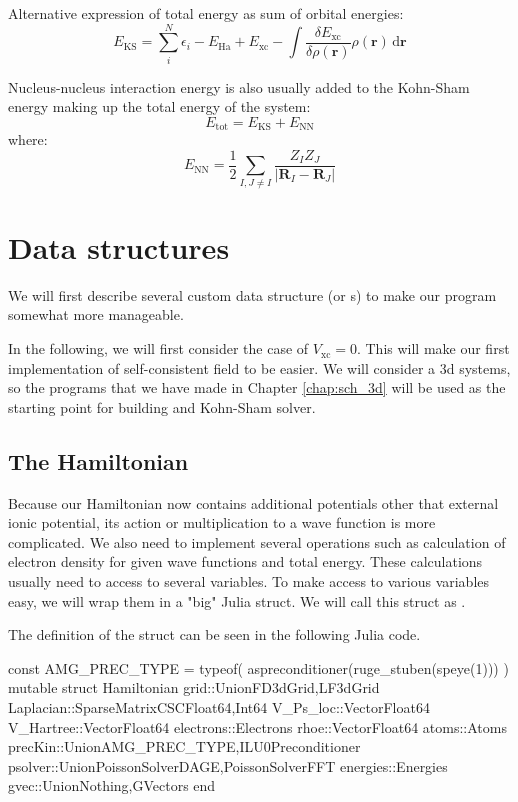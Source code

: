 Alternative expression of total energy as sum of orbital energies:
\begin{equation}
E_{\mathrm{KS}} = \sum_{i}^{N} \epsilon_{i} - E_{\mathrm{Ha}} + E_{\mathrm{xc}}
- \int \frac{\delta E_{\mathrm{xc}}}{\delta \rho(\mathbf{r})} \rho(\mathbf{r})
\,\mathrm{d}\mathbf{r}
\end{equation}

Nucleus-nucleus interaction energy is also usually added to the Kohn-Sham energy
making up the total energy of the system:
\begin{equation}
E_{\mathrm{tot}} = E_{\mathrm{KS}} + E_{\mathrm{NN}}
\end{equation}
where:
\begin{equation}
E_{\mathrm{NN}} = \frac{1}{2} \sum_{I,J \neq I}
\frac{Z_{I} Z_{J}}{\left| \mathbf{R}_{I} - \mathbf{R}_{J} \right|}
\end{equation}



\section{Data structures}

We will first describe several custom data structure (or s)
to make our program somewhat more manageable.

In the following, we will first consider the case of
$V_{\mathrm{xc}}=0$. This will make our first implementation
of self-consistent field to be easier.
We will consider a 3d systems, so the programs
that we have made in Chapter \ref{chap:sch_3d} will be used as the starting point
for building and Kohn-Sham solver.

\subsection{The Hamiltonian}

Because our Hamiltonian now contains additional potentials other that external ionic
potential, its action or multiplication to a wave function is
more complicated. We also need to implement several operations such as calculation
of electron density for given wave functions and total energy.
These calculations usually need to access to several variables. To make access to various
variables easy, we will wrap them in a "big" Julia struct. We will call this struct
as .

The definition of the  struct can be seen in the following
Julia code.
\begin{juliacode}
const AMG_PREC_TYPE = typeof( aspreconditioner(ruge_stuben(speye(1))) )
mutable struct Hamiltonian
  grid::Union{FD3dGrid,LF3dGrid}
  Laplacian::SparseMatrixCSC{Float64,Int64}
  V_Ps_loc::Vector{Float64}
  V_Hartree::Vector{Float64}
  electrons::Electrons
  rhoe::Vector{Float64}
  atoms::Atoms
  precKin::Union{AMG_PREC_TYPE,ILU0Preconditioner}
  psolver::Union{PoissonSolverDAGE,PoissonSolverFFT}
  energies::Energies
  gvec::Union{Nothing,GVectors}
end
\end{juliacode}

